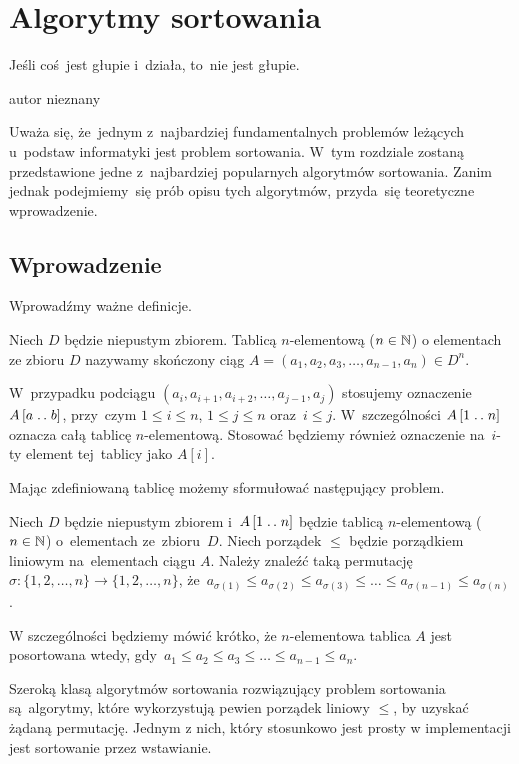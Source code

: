 \chapter{Algorytmy sortowania}

\epigraph{Jeśli coś~jest głupie i~działa, to~nie jest głupie.}{autor nieznany}

Uważa się, że~jednym z~najbardziej fundamentalnych problemów 
leżących u~podstaw informatyki jest problem sortowania. W~tym rozdziale 
zostaną przedstawione jedne z~najbardziej popularnych algorytmów sortowania.
Zanim jednak podejmiemy~się prób opisu tych algorytmów, przyda~się teoretyczne wprowadzenie.

\section{Wprowadzenie}\label{sec:sorting:intro}

Wprowadźmy ważne definicje.

\begin{definition}[Tablica]\label{def:array}
    Niech \( D \) będzie niepustym zbiorem. Tablicą
    \( n \)-elementową (\( n \in \mathbb{N} \)) o elementach
    ze zbioru \( D \) nazywamy skończony ciąg
    \( A = (a_1, a_2, a_3, \dotsc, a_{n - 1}, a_n) \in D^n \).
\end{definition}
\begin{remark}
    W~przypadku podciągu \( (a_i, a_{i + 1}, a_{i + 2}, \dotsc, a_{j - 1}, a_j) \) 
    stosujemy oznaczenie \( A \left[ a \mathrel{{.}\,{.}}\nobreak b \right] \),
    przy~czym \( 1 \le i \le n \), \( 1 \le j \le n \) 
    oraz~\( i \le j \).
    W~szczególności \( A \left[ 1 \mathrel{{.}\,{.}}\nobreak n \right] \) 
    oznacza całą tablicę \( n \)-elementową.
    Stosować będziemy również oznaczenie na~\( i \)-ty 
    element tej~tablicy jako \(A \left[ i \right] \).
\end{remark}
Mając zdefiniowaną tablicę możemy sformułować następujący problem.
\begin{problem}\label{problem:sorting}
    Niech \( D \) będzie niepustym zbiorem 
    i~\( A \left[ 1 \mathrel{{.}\,{.}}\nobreak n \right] \) będzie 
    tablicą \( n \)-elementową (\( n \in \mathbb{N} \)) o~elementach
    ze~zbioru~\( D \).
    Niech porządek \( \le \) będzie porządkiem liniowym 
    na~elementach ciągu \( A \).
    Należy znaleźć taką permutację 
    \( \sigma : \{ 1, 2, \dotsc, n \} \to \{ 1, 2, \dotsc, n \} \), 
    że~\( a_{\sigma(1)} \le a_{\sigma(2)} \le a_{\sigma(3)} 
    \le \dotso \le a_{\sigma(n - 1)} \le a_{\sigma(n)} \).
\end{problem}

\begin{remark}
    W szczególności będziemy mówić krótko, że \( n \)-elementowa tablica \( A \) 
    jest posortowana wtedy, 
    gdy~\( a_1 \le a_2 \le a_3 \le \dotso \le a_{n - 1} \le a_n \).
\end{remark}

Szeroką klasą algorytmów sortowania rozwiązujący problem sortowania
są~algorytmy, które wykorzystują pewien porządek liniowy \( \le \),
by uzyskać żądaną permutację. Jednym z nich, który stosunkowo
jest prosty w implementacji jest sortowanie przez wstawianie.



